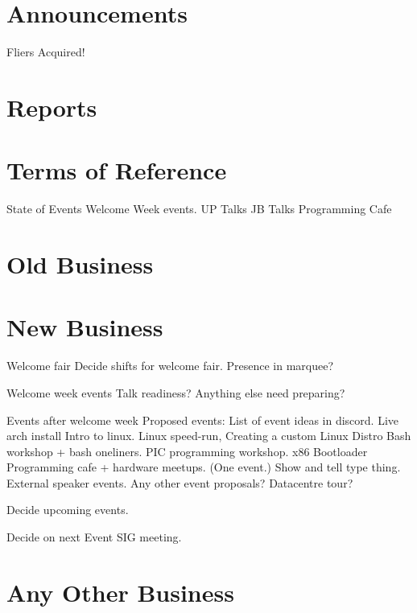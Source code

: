 \documentclass[11pt,hacksoc,agenda]{meetingmins}
\begin{document}
\maketitle

\section{Announcements}
\begin{items}
  \item {Fliers Acquired!}
\end{items}

\section{Reports}

\section{Terms of Reference}
\begin{items}
  \item {State of Events}
  \subitem Welcome Week events.
  \subsubitem UP Talks
  \subsubitem JB Talks
  \subsubitem Programming Cafe
\end{items}

\section{Old Business}

\section{New Business}
\begin{items}
  \item {Welcome fair}
  \subitem Decide shifts for welcome fair.
  \subitem Presence in marquee?
  \item {Welcome week events}
  \subitem Talk readiness?
  \subitem Anything else need preparing?
  \item {Events after welcome week}
  \subitem Proposed events:
  \subsubitem List of event ideas in discord.
  \subsubitem Live arch install
  \subsubitem Intro to linux.
  \subsubitem Linux speed-run,
  \subsubitem Creating a custom Linux Distro
  \subsubitem Bash workshop + bash oneliners.
  \subsubitem PIC programming workshop.
  \subsubitem x86 Bootloader
  \subsubitem Programming cafe + hardware meetups. (One event.) Show and tell type thing.
  \subsubitem External speaker events.
  \subitem Any other event proposals?
  \subsubitem Datacentre tour?
  \item {Decide upcoming events.}

  \item {Decide on next Event SIG meeting.}

\end{items}

\section{Any Other Business}

\vspace{1em}
\end{document}

